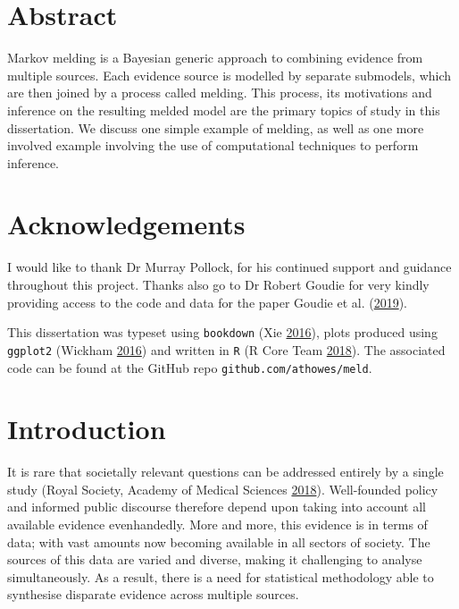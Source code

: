 \documentclass[11pt,]{book}
\begin{document}
{
\setcounter{tocdepth}{1}
\tableofcontents
}
\chapter*{Abstract}\label{abstract}

Markov melding is a Bayesian generic approach to combining evidence from
multiple sources. Each evidence source is modelled by separate
submodels, which are then joined by a process called melding. This
process, its motivations and inference on the resulting melded model are
the primary topics of study in this dissertation. We discuss one simple
example of melding, as well as one more involved example involving the
use of computational techniques to perform inference.

\chapter*{Acknowledgements}\label{acknowledgements}

I would like to thank Dr Murray Pollock, for his continued support and
guidance throughout this project. Thanks also go to Dr Robert Goudie for
very kindly providing access to the code and data for the paper Goudie
et al. (\protect\hyperlink{ref-goudie2019joining}{2019}).

This dissertation was typeset using \texttt{bookdown} (Xie
\protect\hyperlink{ref-bookdown}{2016}), plots produced using
\texttt{ggplot2} (Wickham \protect\hyperlink{ref-ggplot2}{2016}) and
written in \texttt{R} (R Core Team \protect\hyperlink{ref-r}{2018}). The
associated code can be found at the GitHub repo
\texttt{github.com/athowes/meld}.

\chapter{Introduction}\label{introduction}

It is rare that societally relevant questions can be addressed entirely
by a single study (Royal Society, Academy of Medical Sciences
\protect\hyperlink{ref-royal}{2018}). Well-founded policy and informed
public discourse therefore depend upon taking into account all available
evidence evenhandedly. More and more, this evidence is in terms of data;
with vast amounts now becoming available in all sectors of society. The
sources of this data are varied and diverse, making it challenging to
analyse simultaneously. As a result, there is a need for statistical
methodology able to synthesise disparate evidence across multiple
sources.
\end{document}
